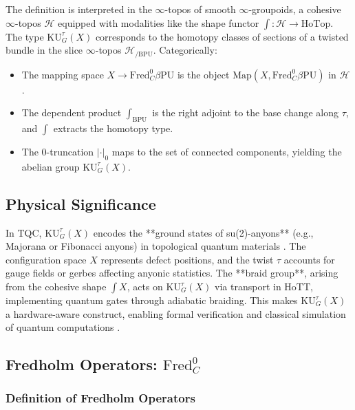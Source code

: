 \documentclass{article}
\theoremstyle{definition}
\begin{document}
The definition is interpreted in the \(\infty\)-topos of smooth \(\infty\)-groupoids, a cohesive \(\infty\)-topos \(\mathcal{H}\) equipped with modalities like the shape functor \(\int: \mathcal{H} \to \text{HoTop}\). The type \(\mathrm{KU}^\tau_G(X)\) corresponds to the homotopy classes of sections of a twisted bundle in the slice \(\infty\)-topos \(\mathcal{H}_{/\mathrm{BPU}}\). Categorically:

\begin{itemize}
    \item The mapping space \(X \to \text{Fred}_C^0 \beta \mathrm{PU}\) is the object \(\text{Map}(X, \text{Fred}_C^0 \beta \mathrm{PU})\) in \(\mathcal{H}\).
    \item The dependent product \(\int_{\mathrm{BPU}}\) is the right adjoint to the base change along \(\tau\), and \(\int\) extracts the homotopy type.
    \item The 0-truncation \(|\cdot|_0\) maps to the set of connected components, yielding the abelian group \(\mathrm{KU}^\tau_G(X)\).
\end{itemize}

\subsection{Physical Significance}

In TQC, \(\mathrm{KU}^\tau_G(X)\) encodes the **ground states of su(2)-anyons** (e.g., Majorana or Fibonacci anyons) in topological quantum materials \cite{SatiSchreiber2022Anyonic}. The configuration space \(X\) represents defect positions, and the twist \(\tau\) accounts for gauge fields or gerbes affecting anyonic statistics. The **braid group**, arising from the cohesive shape \(\int X\), acts on \(\mathrm{KU}^\tau_G(X)\) via transport in HoTT, implementing quantum gates through adiabatic braiding. This makes \(\mathrm{KU}^\tau_G(X)\) a hardware-aware construct, enabling formal verification and classical simulation of quantum computations \cite{SatiSchreiber2022}.

\subsection{Fredholm Operators: \(\text{Fred}^0_C\)}
\label{sec:fredholm}

\subsubsection{Definition of Fredholm Operators}
\end{document}
